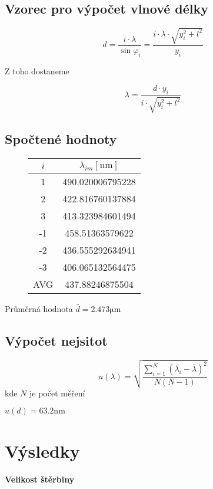 \documentclass[a4paper,10pt]{article}
\begin{document}
\subsection{Vzorec pro výpočet vlnové délky}

\begin{equation}
 d = \frac{i \cdot \lambda}{\sin{\varphi_i}} = \frac{i \cdot \lambda \cdot \sqrt{y_i^2 + l^2}}{y_i}
\end{equation}

Z toho dostaneme

\begin{equation}
 \lambda = \frac{d \cdot y_i}{i \cdot \sqrt{y_i^2 + l^2}}
\end{equation}

\subsection{Spočtené hodnoty}

\begin{figure}[H]
	\centering
    \begin{tabular}{c||c}
        $i$ & $\lambda_{i m} [\si{\nano\meter}]$\\ \hline \hline
        1 & 490.020006795228 \\ \hline
        2 & 422.816760137884 \\ \hline
        3 & 413.323984601494 \\ \hline
        -1 & 458.51363579622 \\ \hline
        -2 & 436.555292634941 \\ \hline
        -3 & 406.065132564475 \\ \hline
        AVG & 437.88246875504
    \end{tabular}
\end{figure}

Průměrná hodnota $\bar{d} = 2.473 \si{\micro\meter}$

\subsection{Výpočet nejsitot}

\begin{equation}
 u(\lambda) = \sqrt{\frac{\sum_{i=1}^N(\lambda_i-\bar{\lambda})^2}{N(N-1)}}
\end{equation}
kde $N$ je počet měření

$u(d) = 63.2 \si{\nano\meter}$

\section{Výsledky}
\textbf{Velikost štěrbiny}
\end{document}
